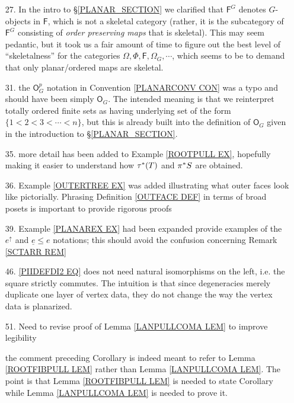 \documentclass{article}
\begin{document}
\begin{itemize}
	\item[27.] In the intro to \S \ref{PLANAR_SECTION} we
	clarified that $\mathsf{F}^G$ denotes $G$-objects in $\mathsf{F}$,
	which is not a skeletal category (rather, it is the subcategory of $\mathsf{F}^G$ consisting of \emph{order preserving maps} that is skeletal).
	This may seem pedantic,
	but it took us a fair amount of time to figure out the best level of ``skeletalness'' for the categories 
	$\Omega, \Phi, \mathsf{F}, \Omega_G, \cdots$, 
	which seems to be to demand that only planar/ordered maps are skeletal.
	
	\item[31.] the $\mathsf{O}^p_G$ notation in 
	Convention \ref{PLANARCONV CON}
	was a typo and should have been simply $\mathsf{O}_G$.
	The intended meaning is that we reinterpret totally ordered finite sets as having underlying set of the form
	$\{1<2<3<\cdots <n\}$,
	but this is already built into the definition of 
	$\mathsf{O}_G$ given in the introduction to
	\S \ref{PLANAR_SECTION}.
	
	\item[35.] more detail has been added to Example \ref{ROOTPULL EX}, hopefully making it easier to understand 
	how $\tau^{\**}(T)$ and $\pi^{\**}S$ are obtained.
	
	\item[36.] Example \ref{OUTERTREE EX} was added illustrating what outer faces look like pictorially. 
	Phrasing Definition \ref{OUTFACE DEF} 
	in terms of broad posets   
	is important to provide rigorous proofs
	
	\item[39.] Example \ref{PLANAREX EX} had been expanded provide examples of the $e^{\uparrow}$
	and $\underline{e} \leq e$
	notations; this should avoid the confusion concerning 
	Remark \ref{SCTARR REM}
	
	\item[46.] \eqref{PIIDEFDI2 EQ} does not need natural isomorphisms on the left, i.e. the square strictly commutes. The intuition is that since degeneracies merely duplicate one layer of vertex data, they do not change the way the vertex data is planarized. 
	
	\item[51.] 
	{\color{red} Need to revise proof of Lemma \ref{LANPULLCOMA LEM}
	to improve legibility}
	
	the comment preceding Corollary \label{MONDEFCOR COR}
	is indeed meant to refer to Lemma \ref{ROOTFIBPULL LEM}
	rather than Lemma \ref{LANPULLCOMA LEM}.
	The point is that Lemma \ref{ROOTFIBPULL LEM}
	is needed to state Corollary \label{MONDEFCOR COR}
	while 
	Lemma \ref{LANPULLCOMA LEM} is needed to prove it.
	

\end{itemize}
\end{document}
